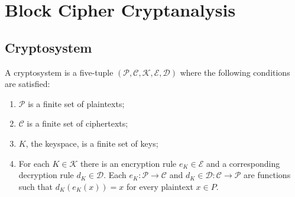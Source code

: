 \chapter{Block Cipher Cryptanalysis}
\label{chapter:block_cipher_cryptanalysis} 
\section{Cryptosystem}
\begin{defn}
\citep{cryptosystem_definition_book}A cryptosystem is a five-tuple $\mathcal{(P,C,K,E,D)}$ where the following conditions are satisfied:
\begin{enumerate}
\item $\mathcal{P}$ is a finite set of plaintexts;
\item $\mathcal{C}$ is a finite set of ciphertexts;
\item $K$, the keyspace, is a finite set of keys;
\item For each $K \in \mathcal{K}$ there is an encryption rule $e_K \in \mathcal{E}$ and a corresponding decryption rule $d_K \in \mathcal{D}$. Each $e_K:\mathcal{P} \to \mathcal{C}$ and $d_K \in \mathcal{D} : \mathcal{C} \to \mathcal{P}$ are functions such that $d_K(e_K(x)) = x$ for every plaintext $x \in P$.
\end{enumerate}
\end{defn} 
